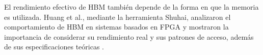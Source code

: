 El rendimiento efectivo de HBM también depende de la forma en que la memoria
es utilizada. Huang et al., mediante la herramienta Shuhai, analizaron el
comportamiento de HBM en sistemas basados en FPGA y mostraron la importancia
de considerar su rendimiento real y sus patrones de acceso, además de sus
especificaciones teóricas \cite{huang2022shuhai}.